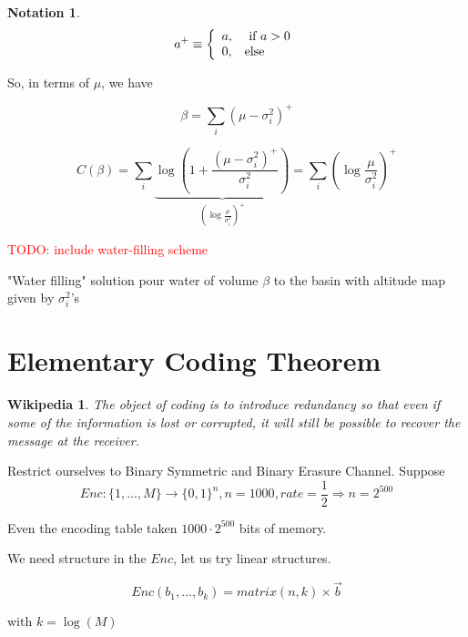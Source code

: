 \documentclass[twoside]{article}
\newtheorem*{wikipedia}{Wikipedia}
\newtheorem{notation}{Notation}
\theoremstyle{definition} %
\newcommand{\todo}[1]{\textcolor{red}{TODO: #1}}
\begin{document}
\begin{notation}
  \begin{align*}
    a^+ \equiv
    \left\{
    \begin{array}{l l}
      a, & \text{ if } a > 0 \\
      0, & \text{else}
    \end{array}
    \right.
  \end{align*}
\end{notation}

So, in terms of $\mu$, we have

\[
  \beta = \sum_i(\mu - \sigma^2_i)^+
\]

\[
  C(\beta) = \sum_i \underbrace{\log(1 + \frac{(\mu - \sigma_i^2)^+}{\sigma_i^2})}_{(\log \frac{\mu}{\sigma^2_i})^+} = \sum_i \left(\log \frac{\mu}{\sigma^2_i}\right)^+
\]

\todo{include water-filling scheme}

"Water filling" solution pour water of volume $\beta$ to the basin with altitude map given by $\sigma^2_i$'s



\cleardoublepage
\section{Elementary Coding Theorem}

\begin{wikipedia}
  The object of coding is to introduce redundancy so that even if some of the information is lost or corrupted, it will still be possible to recover the message at the receiver.
\end{wikipedia}

Restrict ourselves to Binary Symmetric and Binary Erasure Channel. Suppose
\[
  Enc: \{1, ..., M\} \rightarrow \{ 0, 1\}^n, n = 1000, rate = \frac{1}{2}
  \Rightarrow n = 2^{500}
\]

Even the encoding table taken $1000 \cdot 2^{500}$ bits of memory.

We need structure in the $Enc$, let us try linear structures.

\[
  Enc(b_1, ..., b_k) = matrix(n, k) \times \vec{b}
\]

with $k = \log(M)$
\end{document}
